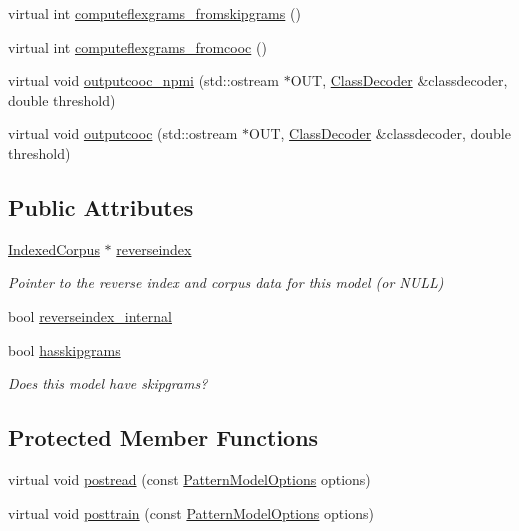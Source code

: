 \begin{DoxyCompactItemize}
virtual int \hyperlink{classPatternModel_a833c6478ea967a4fa4c75c8ff971eac8}{computeflexgrams\+\_\+fromskipgrams} ()
\item 
virtual int \hyperlink{classPatternModel_ac892ccc87080bc5eec5e8cb15460a15a}{computeflexgrams\+\_\+fromcooc} ()
\item 
virtual void \hyperlink{classPatternModel_aef998f743259e8d85d48b81eede5bd00}{outputcooc\+\_\+npmi} (std\+::ostream $\ast$O\+U\+T, \hyperlink{classClassDecoder}{Class\+Decoder} \&classdecoder, double threshold)
\item 
virtual void \hyperlink{classPatternModel_ab9876cdcaeffbd2c04350e73b2be0bc3}{outputcooc} (std\+::ostream $\ast$O\+U\+T, \hyperlink{classClassDecoder}{Class\+Decoder} \&classdecoder, double threshold)
\end{DoxyCompactItemize}
\subsection*{Public Attributes}
\begin{DoxyCompactItemize}
\item 
\hyperlink{classIndexedCorpus}{Indexed\+Corpus} $\ast$ \hyperlink{classPatternModel_af816b73fbc0a1247f54fbb50593dce22}{reverseindex}
\begin{DoxyCompactList}\small\item\em Pointer to the reverse index and corpus data for this model (or N\+U\+L\+L) \end{DoxyCompactList}\item 
bool \hyperlink{classPatternModel_a42dc001ef7580e133518d4cc9164cad9}{reverseindex\+\_\+internal}
\item 
bool \hyperlink{classPatternModel_a56ba07cb9c7691cb228903681d707436}{hasskipgrams}
\begin{DoxyCompactList}\small\item\em Does this model have skipgrams? \end{DoxyCompactList}\end{DoxyCompactItemize}
\subsection*{Protected Member Functions}
\begin{DoxyCompactItemize}
\item 
virtual void \hyperlink{classPatternModel_a0e475078b9e3501c7ae8fc5d5683f671}{postread} (const \hyperlink{classPatternModelOptions}{Pattern\+Model\+Options} options)
\item 
virtual void \hyperlink{classPatternModel_a4dc600e5f375d412917c30c62265d6e8}{posttrain} (const \hyperlink{classPatternModelOptions}{Pattern\+Model\+Options} options)
\end{DoxyCompactItemize}
